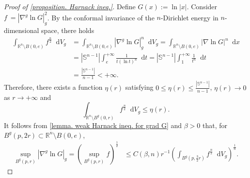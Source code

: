 \documentclass[12pt]{amsart}
\theoremstyle{plain}
\theoremstyle{definition}
\theoremstyle{remark}     %
\numberwithin{equation}{section}
\newcommand{\dd}{\mathop{}\!\mathrm{d}}%
\newcommand{\dx}{\mathop{}\!\mathrm{d}x}
\begin{document}
\begin{proof}[Proof of \cref{proposition. Harnack ineq.}]
    Define $G(x):=\ln |x|$. Consider $f\:=|\nabla^g \ln G|_g^2$.
    By the conformal invariance of the $n$-Dirichlet energy in $n$-dimensional space, there holds
    \begin{align*}
        \int_{\mathbb{R}^n\setminus B(0,e)}f^{\frac{n}{2}}\dd V_g
        &=\int_{\mathbb{R}^n\setminus B(0,e)} |\nabla^g \ln G|_g^n\dd V_g
        =\int_{\mathbb{R}^n\setminus B(0,e)} |\nabla \ln G|^n\dx\\
        &=|\mathbb{S}^{n-1}|\int_e^{+\infty}\frac{1}{t(\ln t)^n}\dd t
        =|\mathbb{S}^{n-1}|\int_1^{+\infty}\frac{1}{t^n}\dd t\\
        &=\frac{|\mathbb{S}^{n-1}|}{n-1}<+\infty.
    \end{align*}
    Therefore, there exists a function $\eta(r)$ satisfying $0\leq \eta(r)\leq \frac{|\mathbb{S}^{n-1}|}{n-1}$, $\eta(r)\to0$ as $r\to +\infty$ and
    \begin{equation}\label{ineq. smallness of integral of f to n/2}
        \int_{\mathbb{R}^n\setminus B^g(0,r)} f^{\frac{n}{2}}\dd V_g
        \leq \eta(r).
    \end{equation}
    It follows from \cref{lemma. weak Harnack ineq. for grad G} and $\beta>0$ that, for 
    $ B^g(p, 2r)\subset \mathbb{R}^n\setminus B(0,e)$,
    \begin{align}\label{ineq. upper bound of gradient of ln G}
        \sup_{B^g(p,r)}|\nabla^g \ln G|_g
    =(\sup_{B^g(p,r)} f)^{\frac{1}{2}}
    &\leq C(\beta,n) r^{-1} (\int_{B^g(p,\frac{3}{2}r)} f^{\frac{n}{2}}\dd V_g )^{\frac{1}{n}}.
    \end{align}


\end{proof}
\end{document}
